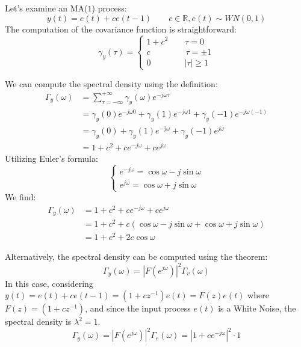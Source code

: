 \begin{example}
    Let's examine an MA($1$) process:
    \[y(t)=e(t)+ce(t-1)\qquad c\in\mathbb{R},e(t)\sim WN(0,1)\]
    The computation of the covariance function is straightforward:
    \[\gamma_y(\tau)=\begin{cases}
        1+c^2 \qquad \tau=0 \\
        c \qquad\qquad\: \tau=\pm 1 \\
        0 \qquad\qquad \left\lvert \tau\right\rvert \geq 1
    \end{cases}\]

    We can compute the spectral density using the definition:
    \begin{align*}
        \Gamma_y(\omega)    &=\sum_{\tau=-\infty}^{+\infty}\gamma_y(\omega)e^{-j\omega\tau} \\
                            &=\gamma_y(0)e^{-j\omega 0} + \gamma_y(1)e^{-j\omega 1} +\gamma_y(-1)e^{-j\omega(-1)} \\
                            &=\gamma_y(0) + \gamma_y(1)e^{-j\omega} +\gamma_y(-1)e^{j\omega} \\
                            &=1+c^2 + ce^{-j\omega} +ce^{j\omega}                  
    \end{align*}
    Utilizing Euler's formula:
    \[\begin{cases}
        e^{-j\omega}= \cos\omega-j\sin\omega \\
        e^{j\omega}= \cos\omega+j\sin\omega
    \end{cases}\]
    We find:
    \begin{align*}
        \Gamma_y(\omega)    &=1+c^2 + ce^{-j\omega} +ce^{j\omega} \\        
                            &=1+c^2 + c\left(\cos\omega-j\sin\omega+\cos\omega+j\sin\omega\right) \\    
                            &=1+c^2 + 2c\cos\omega                               
    \end{align*}

    Alternatively, the spectral density can be computed using the theorem:
    \[\Gamma_y(\omega)=\left\lvert F(e^{j\omega})\right\rvert^2 \Gamma_v(\omega)\]
    In this case, considering $y(t)=e(t)+ce(t-1)=\left(1+cz^{-1}\right)e(t)=F(z)e(t)$ where $F(z)=\left(1+cz^{-1}\right)$, and since the input process $e(t)$ is a  White Noise, the spectral density is $\lambda^2=1$.
    \[\Gamma_y(\omega)=\left\lvert F(e^{j\omega})\right\rvert^2 \Gamma_e(\omega)=\left\lvert 1+ce^{-j\omega}\right\rvert^2 \cdot 1\]
    

\end{example}

